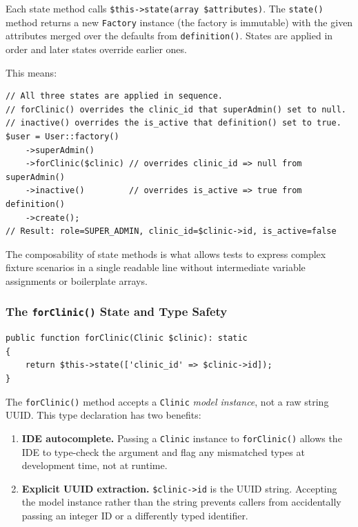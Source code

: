 Each state method calls \texttt{\$this->state(array \$attributes)}. The
\texttt{state()} method returns a new \texttt{Factory} instance (the
factory is immutable) with the given attributes merged over the defaults
from \texttt{definition()}. States are applied in order and later states
override earlier ones.

This means:

\begin{lstlisting}[style=php, caption={State composition example.}, label={lst:state-compose}]
// All three states are applied in sequence.
// forClinic() overrides the clinic_id that superAdmin() set to null.
// inactive() overrides the is_active that definition() set to true.
$user = User::factory()
    ->superAdmin()
    ->forClinic($clinic) // overrides clinic_id => null from superAdmin()
    ->inactive()         // overrides is_active => true from definition()
    ->create();
// Result: role=SUPER_ADMIN, clinic_id=$clinic->id, is_active=false
\end{lstlisting}

The composability of state methods is what allows tests to express
complex fixture scenarios in a single readable line without
intermediate variable assignments or boilerplate arrays.

\subsubsection{The \texttt{forClinic()} State and Type Safety}

\begin{lstlisting}[style=php, caption={forClinic() state.}, label={lst:for-clinic}]
public function forClinic(Clinic $clinic): static
{
    return $this->state(['clinic_id' => $clinic->id]);
}
\end{lstlisting}

The \texttt{forClinic()} method accepts a \texttt{Clinic} \emph{model
instance}, not a raw string UUID. This type declaration has two benefits:

\begin{enumerate}
  \item \textbf{IDE autocomplete.} Passing a \texttt{Clinic} instance
    to \texttt{forClinic()} allows the IDE to type-check the argument
    and flag any mismatched types at development time, not at runtime.
  \item \textbf{Explicit UUID extraction.} \texttt{\$clinic->id} is the
    UUID string. Accepting the model instance rather than the string
    prevents callers from accidentally passing an integer ID or a
    differently typed identifier.
\end{enumerate}

